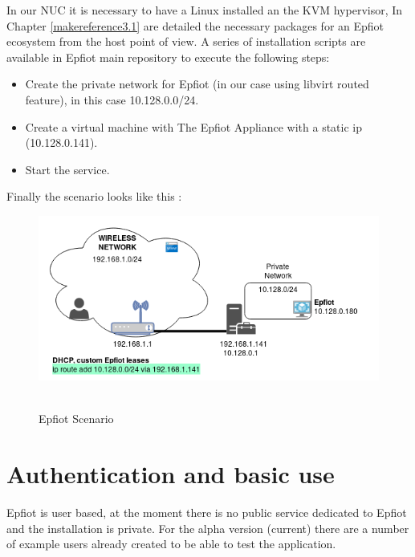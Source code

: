 In our NUC it is necessary to have a Linux installed an the KVM hypervisor, In Chapter \ref{makereference3.1} are detailed the necessary packages for an Epfiot ecosystem from the host point of view. 
A series of installation scripts are available in Epfiot main repository \cite{epfiot_install} to execute the following steps:

\begin{itemize}
    \item Create the private network for Epfiot (in our case using libvirt routed feature), in this case 10.128.0.0/24.
    \item Create a virtual machine with The Epfiot Appliance with a static ip (10.128.0.141).
    \item Start the service.
\end{itemize}

Finally the scenario looks like this        :

\begin{figure}[h!]%
\centering
    \includegraphics[width=5.5in]{figures/Epfiot_example.png}
~\caption{Epfiot Scenario}
\label{figure6.1}
\end{figure}

\newpage
\section{Authentication and basic use}
\label{makereference6.2}

Epfiot is user based, at the moment there is no public service dedicated to Epfiot and the installation is private.
For the alpha version (current) there are a number of example users already created to be able to test the application. 

